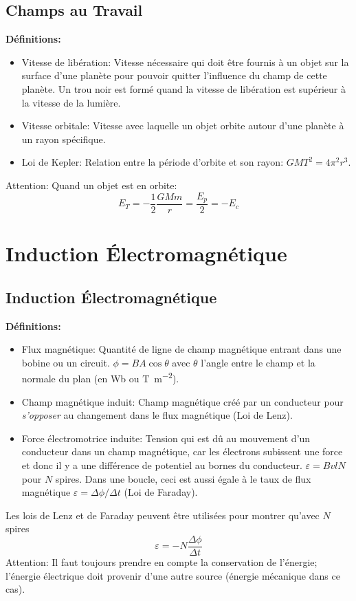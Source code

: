 \documentclass[french, a4paper, 12pt]{article}
\begin{document}
\subsection{Champs au Travail}
\textbf{Définitions:}
\begin{itemize}
\item Vitesse de libération: Vitesse nécessaire qui doit être fournis à un objet sur la surface d'une planète pour pouvoir quitter l'influence du champ de cette planète. Un trou noir est formé quand la vitesse de libération est supérieur à la vitesse de la lumière.
\item Vitesse orbitale: Vitesse avec laquelle un objet orbite autour d'une planète à un rayon spécifique.
\item Loi de Kepler: Relation entre la période d'orbite et son rayon: $GMT^2=4\pi ^2r^3$.
\end{itemize}
Attention: Quand un objet est en orbite: \[E_T=-\frac{1}{2} \frac{GMm}{r}=\frac{E_p}{2}=-E_c\]
\pagebreak

\section{Induction Électromagnétique}
\subsection{Induction Électromagnétique}
\textbf{Définitions:}
\begin{itemize}
\item Flux magnétique: Quantité de ligne de champ magnétique entrant dans une bobine ou un circuit. $\phi = BA\cos \theta$ avec $\theta$ l'angle entre le champ et la normale du plan (en \si{\weber} ou \si{\tesla\per\meter\squared}).
\item Champ magnétique induit: Champ magnétique créé par un conducteur pour \emph{s'opposer} au changement dans le flux magnétique (Loi de Lenz).
\item Force électromotrice induite: Tension qui est dû au mouvement d'un conducteur dans un champ magnétique, car les électrons subissent une force et donc il y a une différence de potentiel au bornes du conducteur. $\varepsilon = BvlN$ pour $N$ spires. Dans une boucle, ceci est aussi égale à le taux de flux magnétique $\varepsilon = \Delta \phi / \Delta t$ (Loi de Faraday).
\end{itemize}
Les lois de Lenz et de Faraday peuvent être utilisées pour montrer qu'avec $N$ spires\[\varepsilon = -N\frac{\Delta\phi}{\Delta t}\]
Attention: Il faut toujours prendre en compte la conservation de l'énergie; l'énergie électrique doit provenir d'une autre source (énergie mécanique dans ce cas).
\end{document}
